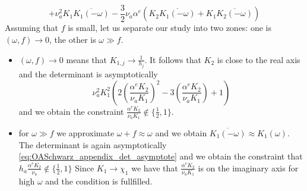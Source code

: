 \begin{subappendices}
\begin{equation}
+ \nu_a^2 K_1 \overline{K_1(-\omega)}
- \frac{3}{2} \nu_a \alpha^e \left(K_2 \overline{K_1(-\omega)}
+ K_1 \overline{K_2(-\omega)}
\right)
\end{equation}
Assuming that $f$ is small, let us separate our study into two zones:
one is $(\omega, f) \rightarrow 0$, the other is $\omega \gg f$.
\begin{itemize}
 \item $(\omega, f) \rightarrow 0$
	means that $K_{1,j} \rightarrow \frac{1}{h_j}$.
	It follows that $K_2$ is close to the real axis and the determinant
	is asymptotically
	\begin{equation}
		\label{eq:OASchwarz_appendix_det_asymptote}
	\nu_a^2 K_1^2 \left(2 \left(\frac{\alpha^e K_2}{\nu_a K_1}\right)^2
		- 3 \left(\frac{\alpha^e K_2}{\nu_a K_1}\right) + 1 \right)
	\end{equation}
	and we obtain the constraint
	$\frac{\alpha^e K_2}{\nu_a K_1}
	\notin \{\frac{1}{2},1\}$.
 \item for $\omega \gg f$ we approximate $\omega+f \approx \omega$
	 and we obtain $\overline{K_1(-\omega)} \approx K_1(\omega)$.
	 The determinant is again asymptotically
	\eqref{eq:OASchwarz_appendix_det_asymptote}
	and we obtain the constraint that
	$h_a\frac{\alpha^e K_2}{\nu_a} \notin \{\frac{1}{2},1\}$
	Since $K_1 \rightarrow \chi_1$ we have that
	$\frac{\alpha^e K_2}{\nu_a K_1}$ is on the imaginary axis for
	high $\omega$ and the condition is fullfilled.
\end{itemize}
\end{subappendices}
